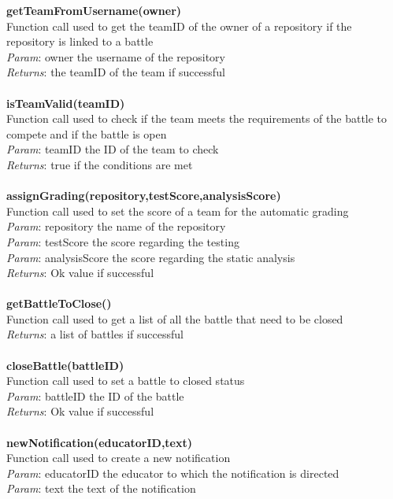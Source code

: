 \documentclass{article}
\begin{document}
\textbf{getTeamFromUsername(owner)}\\
Function call used to get the teamID of the owner of a repository if the repository is linked to a battle\\
\textit{Param}: owner the username of the repository\\
\textit{Returns}: the teamID of the team if successful\\
\\
\textbf{isTeamValid(teamID)}\\
Function call used to check if the team meets the requirements of the battle to compete and if the battle is open\\
\textit{Param}: teamID the ID of the team to check\\
\textit{Returns}: true if the conditions are met\\
\\
\textbf{assignGrading(repository,testScore,analysisScore)}\\
Function call used to set the score of a team for the automatic grading\\
\textit{Param}: repository the name of the repository\\
\textit{Param}: testScore the score regarding the testing\\
\textit{Param}: analysisScore the score regarding the static analysis\\
\textit{Returns}: Ok value if successful\\
\\
\textbf{getBattleToClose()}\\
Function call used to get a list of all the battle that need to be closed\\
\textit{Returns}: a list of battles if successful\\
\\
\textbf{closeBattle(battleID)}\\
Function call used to set a battle to closed status\\
\textit{Param}: battleID the ID of the battle\\
\textit{Returns}: Ok value if successful\\
\\
\textbf{newNotification(educatorID,text)}\\
Function call used to create a new notification\\
\textit{Param}: educatorID the educator to which the notification is directed\\
\textit{Param}: text the text of the notification\\
\end{document}
